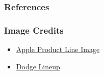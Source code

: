\documentclass[usenames]{beamer}
\begin{document}

\begin{frame}[allowframebreaks]
\frametitle{References}


\end{frame}


\begin{frame}
\frametitle{Image Credits}

\begin{itemize} 
\item \href{https://www.apple.com/ca/store} {Apple Product Line Image}
\item
\href{https://www.motorauthority.com/news/1055062_2011-chicago-auto-show-sporty-r-t-trim-returns-on-five-dodge-models}
{Dodge Lineup}
\end{itemize}

\end{frame}

\end{document}
